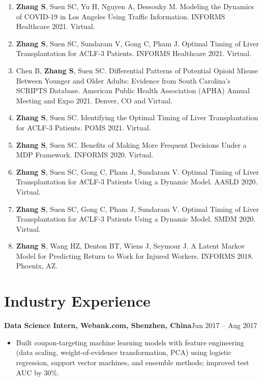 \documentclass[11pt,letterpaper]{article}
\newcommand{\entry}[2]{\textbf{#1}\hfill #2\par}
\newcommand{\me}{\textbf{Zhang S}}
\begin{document}
\begin{enumerate}
        Information. SMDM 2021. Virtual.
  \item \me, Suen SC, Yu H, Nguyen A, Dessouky M. Modeling the Dynamics of COVID-19 in Los Angeles Using Traffic
        Information. INFORMS Healthcare 2021. Virtual.
  \item \me, Suen SC, Sundaram V, Gong C, Pham J. Optimal Timing of Liver Transplantation for ACLF-3 Patients.
        INFORMS Healthcare 2021. Virtual.
  \item Chen B, \me, Suen SC. Differential Patterns of Potential Opioid Misuse Between Younger and Older Adults:
        Evidence from South Carolina's SCRIPTS Database. American Public Health Association (APHA) Annual
        Meeting and Expo 2021. Denver, CO and Virtual.
  \item \me, Suen SC. Identifying the Optimal Timing of Liver Transplantation for ACLF-3 Patients. POMS 2021.
        Virtual.
  \item \me, Suen SC. Benefits of Making More Frequent Decisions Under a MDP Framework. INFORMS 2020. Virtual.
  \item \me, Suen SC, Gong C, Pham J, Sundaram V. Optimal Timing of Liver Transplantation for ACLF-3 Patients
        Using a Dynamic Model. AASLD 2020. Virtual.
  \item \me, Suen SC, Gong C, Pham J, Sundaram V. Optimal Timing of Liver Transplantation for ACLF-3 Patients
        Using a Dynamic Model. SMDM 2020. Virtual.
  \item \me, Wang HZ, Denton BT, Wiens J, Seymour J. A Latent Markov Model for Predicting Return to Work for
        Injured Workers. INFORMS 2018. Phoenix, AZ.
\end{enumerate}

\section{Industry Experience}
\entry{Data Science Intern, Webank.com, Shenzhen, China}{Jun 2017 -- Aug 2017}
\begin{itemize}
  \item Built coupon-targeting machine learning models with feature engineering (data scaling, weight-of-evidence
        transformation, PCA) using logistic regression, support vector machines, and ensemble methods; improved
        test AUC by 30\%.
\end{itemize}
\end{document}
